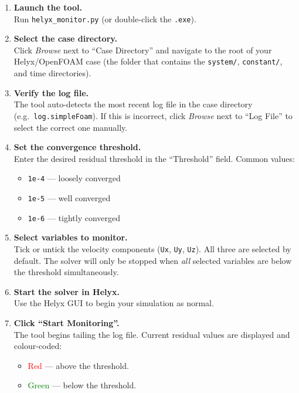 \documentclass[12pt]{article}
\begin{document}
\begin{enumerate}
    \item \textbf{Launch the tool.} \\
    Run \texttt{helyx\_monitor.py} (or double-click the \texttt{.exe}).

    \item \textbf{Select the case directory.} \\
    Click \emph{Browse} next to ``Case Directory'' and navigate to the root of your Helyx/OpenFOAM case (the folder that contains the \texttt{system/}, \texttt{constant/}, and time directories).

    \item \textbf{Verify the log file.} \\
    The tool auto-detects the most recent log file in the case directory (e.g.\ \texttt{log.simpleFoam}). If this is incorrect, click \emph{Browse} next to ``Log File'' to select the correct one manually.

    \item \textbf{Set the convergence threshold.} \\
    Enter the desired residual threshold in the ``Threshold'' field. Common values:
    \begin{itemize}[nosep]
        \item \texttt{1e-4} --- loosely converged
        \item \texttt{1e-5} --- well converged
        \item \texttt{1e-6} --- tightly converged
    \end{itemize}

    \item \textbf{Select variables to monitor.} \\
    Tick or untick the velocity components (\texttt{Ux}, \texttt{Uy}, \texttt{Uz}). All three are selected by default. The solver will only be stopped when \emph{all} selected variables are below the threshold simultaneously.

    \item \textbf{Start the solver in Helyx.} \\
    Use the Helyx GUI to begin your simulation as normal.

    \item \textbf{Click ``Start Monitoring''.} \\
    The tool begins tailing the log file. Current residual values are displayed and colour-coded:
    \begin{itemize}[nosep]
        \item \textcolor{red}{Red} --- above the threshold.
        \item \textcolor{green}{Green} --- below the threshold.
    \end{itemize}


\end{enumerate}
\end{document}
